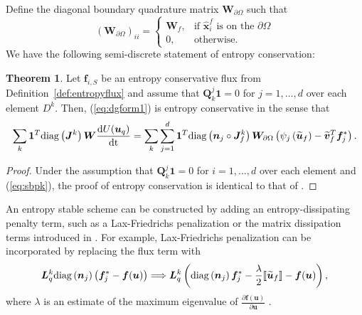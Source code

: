 \documentclass[10pt]{amsart}
\theoremstyle{definition}
\theoremstyle{lemma}
\theoremstyle{theorem}
\newtheorem{theorem}{Theorem}
\theoremstyle{assumption}
\renewcommand{\hat}{\widehat}
\renewcommand{\tilde}{\widetilde}
\newcommand{\td}[2]{\frac{{\rm d}#1}{{\rm d}{\rm #2}}}
\newcommand{\pd}[2]{\frac{\partial#1}{\partial#2}}
\newcommand{\LRp}[1]{\left( #1 \right)}
\newcommand{\LRs}[1]{\left[ #1 \right]}
\newcommand{\jump}[1] {\ensuremath{\llbracket#1\rrbracket}}
\newcommand{\note}[1]{{\color{blue}{#1}}}
\newcommand{\diag}[1]{{\rm diag}\LRp{#1}}
\begin{document}
{Define the diagonal boundary quadrature matrix $\bm{W}_{\partial \Omega}$ such that
\[
\LRp{\bm{W}_{\partial \Omega} }_{ii} = \begin{cases}
  \bm{W}_f, & \text{if $\hat{\bm{x}}^f_i$ is on the $\partial \Omega$}\\
0, & \text{otherwise}. 
\end{cases}
\]
We have the following semi-discrete statement of entropy conservation:
\begin{theorem}
  Let $\bm{f}_{i,S}$ be an entropy conservative flux from Definition~\ref{def:entropyflux} and assume that $\bm{Q}^j_k\bm{1} = 0$ for $j = 1,\ldots,d$ over each element $D^k$.  Then, (\ref{eq:dgform1}) is entropy conservative in the sense that
\[
  \sum_k \bm{1}^T\diag{\bm{J}^k}\bm{W}\td{U(\bm{u}_q)}{t} = \sum_k \sum_{j=1}^d \bm{1}^T\diag{\bm{n}_j\circ\bm{J}^k_f}\bm{W}_{\partial \Omega} \LRp{\psi_j\LRp{\tilde{\bm{u}}_f}-\tilde{\bm{v}}_f^T\bm{f}_j^*}.
\]
\label{thm:stab1}
\end{theorem}
\begin{proof}
Under the assumption that $\bm{Q}^j_k\bm{1} = 0$ for $i = 1,\ldots,d$ over each element and (\ref{eq:sbpk}), the proof of entropy conservation is identical to that of \cite{chan2017discretely}.  
\end{proof}
An entropy stable scheme can be constructed by adding an entropy-dissipating penalty term, such as a Lax-Friedrichs penalization or the matrix dissipation terms introduced in \cite{chandrashekar2013kinetic, winters2017uniquely}.  For example, Lax-Friedrichs penalization can be incorporated by replacing the flux term with
\[
\bm{L}^k_q \diag{\bm{n}_j} \LRp{\bm{f}_j^*-\bm{f}(\bm{u})} \Longrightarrow \bm{L}^k_q\LRp{\diag{\bm{n}_j} \bm{f}_j^* - \frac{\lambda}{2}\jump{\tilde{\bm{u}}_f}- \bm{f}(\bm{u})},
\]
where $\lambda$ is an estimate of the maximum eigenvalue of $\pd{\bm{f}(\bm{u})}{\bm{u}}$ \cite{chen2017entropy, chan2017discretely}.

}
\end{document}
